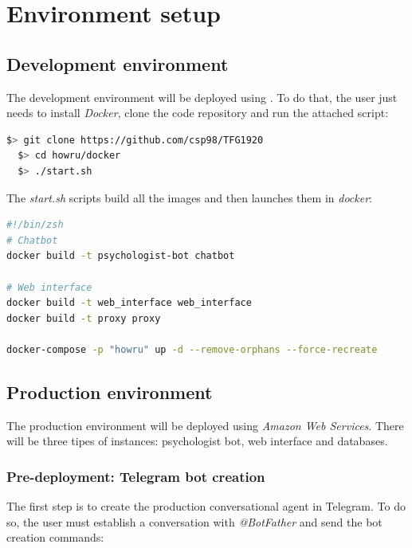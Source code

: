 \documentclass[12pt,english]{article}
\begin{document}
\section{Environment setup}
\label{sec:env_setup}

\subsection{Development environment}

The development environment will be deployed using \cite{docker}. To do that, the user just needs to install \emph{Docker}, clone the code repository and run the attached script:

\begin{lstlisting}[mathescape=false, language=bash, caption={Commands to deploy development environment}, captionpos=b]
  $> git clone https://github.com/csp98/TFG1920
  $> cd howru/docker
  $> ./start.sh
\end{lstlisting}

The \emph{start.sh} scripts build all the images and then launches them in \emph{docker}:

\begin{lstlisting}[language=bash, caption={start.sh script}, captionpos=b]
#!/bin/zsh
# Chatbot
docker build -t psychologist-bot chatbot

# Web interface
docker build -t web_interface web_interface
docker build -t proxy proxy

docker-compose -p "howru" up -d --remove-orphans --force-recreate
\end{lstlisting}
\newpage

\subsection{Production environment}

The production environment will be deployed using \emph{Amazon Web Services}. There will be three tipes of instances: psychologist bot, web interface and databases.

\subsubsection{Pre-deployment: Telegram bot creation}

The first step is to create the production conversational agent in Telegram. To do so, the user must establish a conversation with \emph{@BotFather} and send the bot creation commands:
\end{document}
